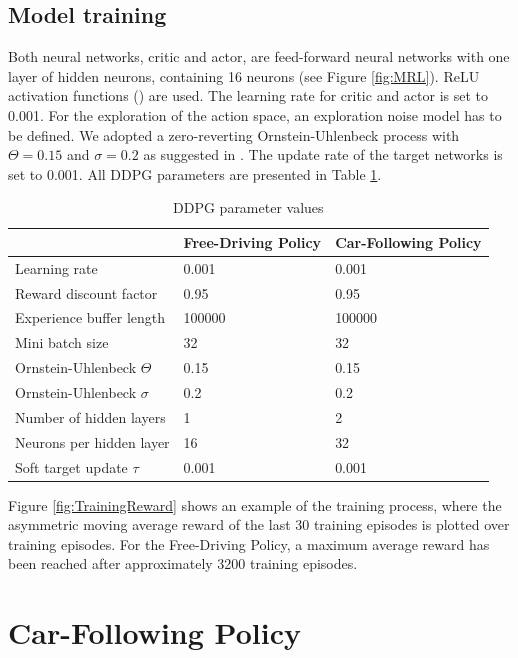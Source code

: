 \documentclass[review]{elsarticle}
\providecommand{\3}{{\ss}}
\begin{document}
\subsection{Model training}
Both neural networks, critic and actor, are feed-forward neural
networks with one layer of hidden neurons, containing 16 neurons (see
Figure \ref{fig:MRL}). ReLU activation functions (\cite{relu}) are used. The learning rate for
critic and actor is set to 0.001. For the exploration of the action
space, an exploration noise model has to be defined. We adopted a
zero-reverting Ornstein-Uhlenbeck process with $\Theta = 0.15$  and $\sigma = 0.2$ as suggested in \cite{DDPG}. The update rate of the target networks is set to 0.001.
All DDPG parameters are presented in Table \ref{tab:DDPGparameters}.
%
  \begin{table}
	\caption{DDPG parameter values} 
	\label{tab:DDPGparameters} 
	\begin{center}
		\begin{tabular}{ p{} p{}  p{} }
			 & Free-Driving Policy & Car-Following Policy \\ \hline
			Learning rate & 0.001 & 0.001\\ 
			Reward discount factor & 0.95 & 0.95 \\ 
			Experience buffer length & 100000 & 100000 \\ 
			Mini batch size & 32 & 32 \\ 			
			Ornstein-Uhlenbeck  $\Theta$ & 0.15& 0.15 \\ 
			Ornstein-Uhlenbeck  $\sigma$ & 0.2 & 0.2 \\ 
			Number of hidden layers & 1 & 2\\
			Neurons per hidden layer & 16 & 32\\
			Soft target update  $\tau$ & 0.001 & 0.001\\
			
			
		\end{tabular}
	\end{center}
\end{table}
%
Figure \ref{fig:TrainingReward} shows an example of the training
process, where the asymmetric moving average reward of the last 30 training episodes is plotted over training episodes. For the Free-Driving Policy, a maximum average reward has been reached after approximately 3200 training episodes.

\section{Car-Following Policy}
\label{sec:CarFollowingPolicy}
\end{document}
